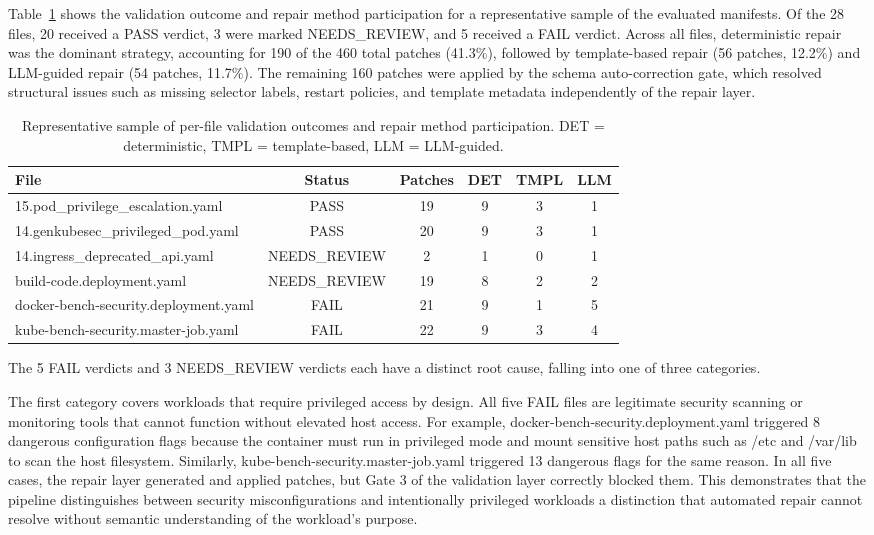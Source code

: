 \documentclass[preprint,12pt]{elsarticle}
\newcommand{\new}[1]{#1}
\newcommand{\safefixtablestyle}{%
  \small
  \setlength{\tabcolsep}{5pt}
  \renewcommand{\arraystretch}{1.15}
}
\begin{document}
\new{
Table~\ref{tab:perfile-breakdown} shows the validation outcome 
and repair method participation for a representative sample of the evaluated manifests. Of the 28 files, 20 received a PASS verdict, 
3 were marked NEEDS\_REVIEW, and 5 received a FAIL verdict. Across 
all files, deterministic repair was the dominant strategy, accounting 
for 190 of the 460 total patches (41.3\%), followed by template-based 
repair (56 patches, 12.2\%) and LLM-guided repair (54 patches, 11.7\%). 
The remaining 160 patches were applied by the schema auto-correction gate, 
which resolved structural issues such as missing selector labels, restart 
policies, and template metadata independently of the repair layer.}
\new{
\begin{table}[htbp]
\centering
\caption{Representative sample of per-file validation outcomes and 
repair method participation. DET = deterministic, TMPL = template-based, 
LLM = LLM-guided.}
\label{tab:perfile-breakdown}
\safefixtablestyle
\scriptsize
\setlength{\tabcolsep}{4pt}
\begin{tabular}{@{} l c c c c c @{}}
\toprule
\textbf{File} & \textbf{Status} & \textbf{Patches} &
\textbf{DET} & \textbf{TMPL} & \textbf{LLM} \\
\midrule
15.pod\_privilege\_escalation.yaml                    & PASS          & 19 &  9 & 3 & 1 \\
14.genkubesec\_privileged\_pod.yaml   & PASS          & 20 &  9 & 3 & 1 \\
14.ingress\_deprecated\_api.yaml      & NEEDS\_REVIEW &  2 &  1 & 0 & 1 \\
build-code.deployment.yaml            & NEEDS\_REVIEW & 19 &  8 & 2 & 2 \\
docker-bench-security.deployment.yaml & FAIL          & 21 &  9 & 1 & 5 \\
kube-bench-security.master-job.yaml   & FAIL          & 22 &  9 & 3 & 4 \\
\bottomrule
\end{tabular}
\end{table}
}
\new{
The 5 FAIL verdicts and 3 NEEDS\_REVIEW verdicts each have a 
distinct root cause, falling into one of three categories. }
\new{
The first category covers workloads that require privileged access 
by design. All five FAIL files are legitimate security scanning or 
monitoring tools that cannot function without elevated host access. 
For example, docker-bench-security.deployment.yaml triggered 8 
dangerous configuration flags because the container must run in 
privileged mode and mount sensitive host paths such as /etc and 
/var/lib to scan the host filesystem. Similarly, 
kube-bench-security.master-job.yaml triggered 13 dangerous flags 
for the same reason. In all five cases, the repair layer generated 
and applied patches, but Gate 3 of the validation layer correctly 
blocked them. This demonstrates that the pipeline distinguishes 
between security misconfigurations and intentionally privileged 
workloads a distinction that automated repair cannot resolve 
without semantic understanding of the workload's purpose. }
\end{document}
